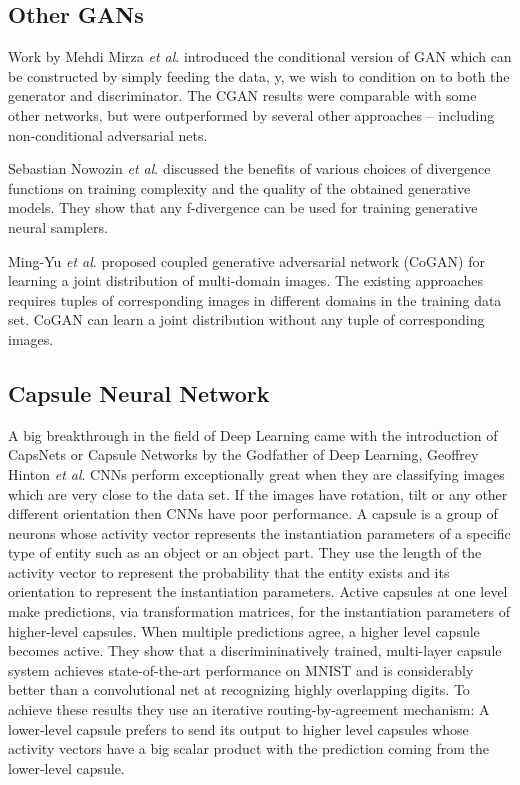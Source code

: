 \documentclass{vldb}
\begin{document}
\subsection{Other GANs} %
\label{sec:other_gan}
Work by Mehdi Mirza \textit{et al}. \cite{congan} introduced the conditional version of GAN which can be constructed by simply feeding the data, y, we wish to condition on to both the generator and discriminator. The CGAN results were comparable with some other networks, but were outperformed by several other approaches – including non-conditional adversarial nets.
\par\bigskip

Sebastian Nowozin \textit{et al}. \cite{vardivmin} discussed the benefits of various choices of divergence functions on training complexity and the quality of the obtained generative models. They show that any f-divergence can be used for training generative neural samplers. 
\par\bigskip

Ming-Yu \textit{et al}. \cite{copgan} proposed coupled generative adversarial network (CoGAN) for learning a joint distribution of multi-domain images. The existing approaches requires tuples of corresponding images in different domains in the training data set. CoGAN can learn a joint distribution without any tuple of corresponding images.
\par\bigskip

\subsection{Capsule Neural Network} %
\label{sec:capsule_neural_network}
A big breakthrough in the field of Deep Learning came with the introduction of CapsNets or Capsule Networks \cite{capsnet} by the Godfather of Deep Learning, Geoffrey Hinton \textit{et al}. CNNs perform exceptionally great when they are classifying images which are very close to the data set. If the images have rotation, tilt or any other different orientation then CNNs have poor performance. A capsule is a group of neurons whose activity vector represents the instantiation parameters of a specific type of entity such as an object or an object part. They use the length of the activity vector to represent the probability that the entity exists and its orientation to represent the instantiation parameters. Active capsules at one level make predictions, via transformation matrices, for the instantiation parameters of higher-level capsules. When multiple predictions agree, a higher level capsule becomes active. They show that a discrimininatively trained, multi-layer capsule system achieves state-of-the-art performance on MNIST and is considerably better than a convolutional net at recognizing highly overlapping digits. To achieve these results they use an iterative routing-by-agreement mechanism: A lower-level capsule prefers to send its output to higher level capsules whose activity vectors have a big scalar product with the prediction coming from the lower-level capsule.
\end{document}
